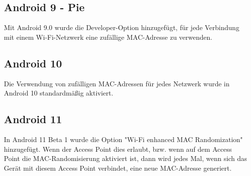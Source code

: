 \subsection{Android 9 - Pie}
Mit Android 9.0 wurde die Developer-Option hinzugefügt,
für jede Verbindung mit einem Wi-Fi-Netzwerk eine zufällige MAC-Adresse zu verwenden.

\subsection{Android 10}
Die Verwendung von zufälligen MAC-Adressen für jedes Netzwerk wurde in Android 10 
standardmäßig aktiviert. 

\subsection{Android 11}
In Android 11 Beta 1 wurde die Option "Wi-Fi enhanced MAC Randomization" hinzugefügt.
Wenn der Access Point dies erlaubt, bzw. wenn auf dem Access Point die MAC-Randomisierung
aktiviert ist, dann wird jedes Mal, wenn sich das Gerät mit diesem Access Point verbindet,
eine neue MAC-Adresse generiert.

\clearpage